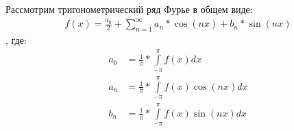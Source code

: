 \documentclass[12pt, a4paper]{article}
\begin{document}
Рассмотрим тригонометрический ряд Фурье в общем виде:
 \begin{equation*}
\begin{aligned}
f(x)=\frac{a_0}{2}+\sum_{n=1}^{\infty}a_n*\cos\left(nx\right)+b_n*\sin\left(nx\right)
\end{aligned}
\end{equation*},
где:
 \begin{equation*}
\begin{aligned}
a_0 &= \frac{1}{\pi}*\int\limits_{-\pi}^{\pi}f(x)dx\\
a_n &= \frac{1}{\pi}*\int\limits_{-\pi}^{\pi}f(x)\cos\left(nx\right)dx\\
b_n &= \frac{1}{\pi}*\int\limits_{-\pi}^{\pi}f(x)\sin\left(nx\right)dx\\
\end{aligned}
\end{equation*}
\end{document}
